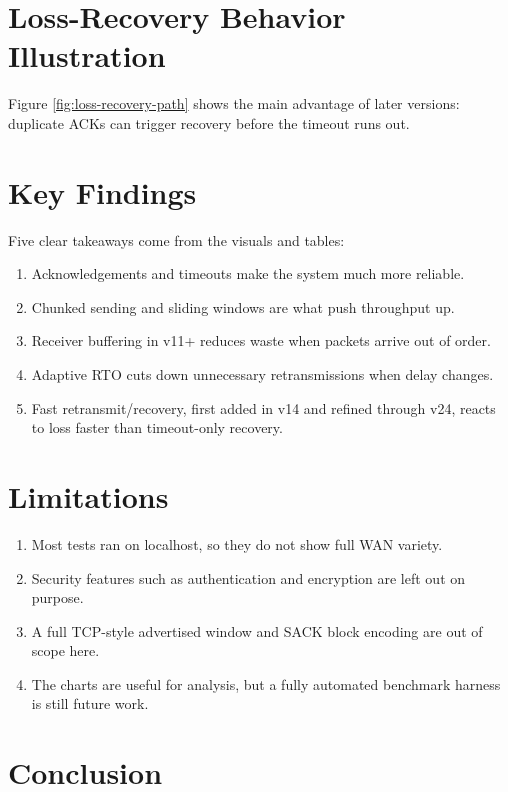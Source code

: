 \section{Loss-Recovery Behavior Illustration}

Figure \ref{fig:loss-recovery-path} shows the main advantage of later
versions: duplicate ACKs can trigger recovery before the timeout runs out.

\section{Key Findings}

Five clear takeaways come from the visuals and tables:

\begin{enumerate}
    \item Acknowledgements and timeouts make the system much more reliable.
    \item Chunked sending and sliding windows are what push throughput up.
    \item Receiver buffering in v11+ reduces waste when packets arrive out of
    order.
    \item Adaptive RTO cuts down unnecessary retransmissions when delay
    changes.
    \item Fast retransmit/recovery, first added in v14 and refined through
    v24, reacts to loss faster than timeout-only recovery.
\end{enumerate}

\section{Limitations}

\begin{enumerate}
    \item Most tests ran on localhost, so they do not show full WAN variety.
    \item Security features such as authentication and encryption are left out
    on purpose.
    \item A full TCP-style advertised window and SACK block encoding are out
    of scope here.
    \item The charts are useful for analysis, but a fully automated benchmark
    harness is still future work.
\end{enumerate}

\section{Conclusion}

